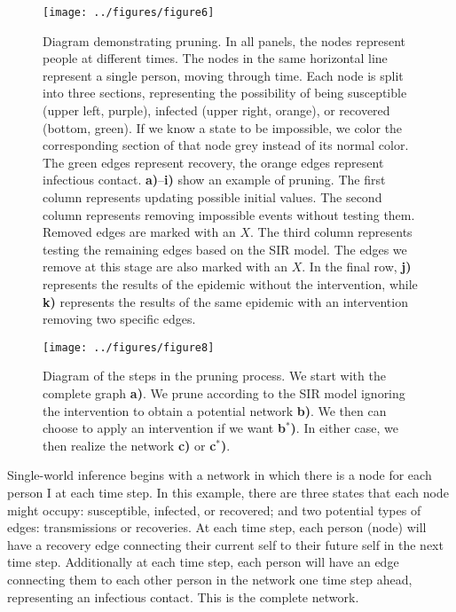 \documentclass[PTRSB]{rsos}
\begin{document}
\begin{figure}\label{fig:pruning}
\texttt{[image: ../figures/figure6]} %
\caption{Diagram demonstrating pruning.  In all panels, the nodes represent people at different times.  The nodes in the same horizontal line represent a single person, moving through time.  Each node is split into three sections, representing the possibility of being susceptible (upper left, purple), infected (upper right, orange), or recovered (bottom, green).  If we know a state to be impossible, we color the corresponding section of that node grey instead of its normal color.  The green edges represent recovery, the orange edges represent infectious contact.  \textbf{a)}--\textbf{i)} show an example of pruning.  The first column represents updating possible initial values.  The second column represents removing impossible events without testing them.  Removed edges are marked with an $X$.  The third column represents testing the remaining edges based on the SIR model.  The edges we remove at this stage are also marked with an $X$.  In the final row, \textbf{j)} represents the results of the epidemic without the intervention, while \textbf{k)} represents the results of the same epidemic with an intervention removing two specific edges.}
\end{figure}

\begin{figure}\label{fig:outline}
\texttt{[image: ../figures/figure8]} %
\caption{Diagram of the steps in the pruning process.  We start with the complete graph \textbf{a)}.  We prune according to the SIR model ignoring the intervention to obtain a potential network \textbf{b)}.  We then can choose to apply an intervention if we want \textbf{b${}^*$)}.  In either case, we then realize the network \textbf{c)} or \textbf{c${}^*$)}.}
\end{figure}

Single-world inference begins with a network in which there is a node for each person I at each time step.
In this example, there are three states that each node might occupy: susceptible, infected, or recovered; and two potential types of edges: transmissions or recoveries.
At each time step, each person (node) will have a recovery edge connecting their current self to their future self in the next time step.
Additionally at each time step, each person will have an edge connecting them to each other person in the network one time step ahead, representing an infectious contact.
This is the complete network.
\end{document}
